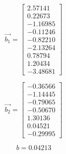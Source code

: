 \documentclass[final,5p,times,twocolumn]{elsarticle}
\begin{document}
\begin{equation*}
\overrightarrow{b_1}=\left[
\begin{array}{r}
  2.57141\\
  0.22673\\
 -1.16985\\
 -0.11246\\
 -0.82210\\
 -2.13264\\
  0.78794\\
  1.20434\\
 -3.48681
\end{array}\right]
\end{equation*}

\begin{equation*}
\overrightarrow{b_2}=\left[
\begin{array}{r}
 -0.36566\\
 -1.14445\\
 -0.79065\\
 -0.50670\\
  1.30136\\
  0.04521\\
 -0.29995
\end{array}\right]
\end{equation*}

\begin{equation*}
b=0.04213
\end{equation*}

%
%
%


%
%
%
%


%
%
%
\end{document}
